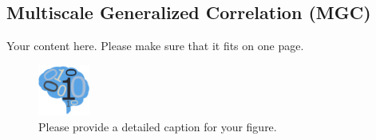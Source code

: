 \documentclass[simplex.tex]{subfiles}
\begin{document}
\subsection{Multiscale Generalized Correlation (MGC)}


Your content here. Please make sure that it fits on one page.

\begin{figure}[!h]
\begin{cframed}
\centering
\includegraphics[width=0.15\textwidth]{neurodata_small.png}
\caption{Please provide a detailed caption for your figure.}
\label{fig:meda}
\end{cframed}
\end{figure}
\end{document}
